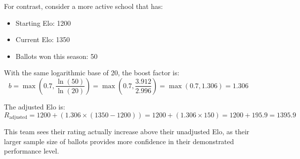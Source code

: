 \documentclass[11pt]{article}
\begin{document}
For contrast, consider a more active school that has:
\begin{itemize}
    \item Starting Elo: 1200
    \item Current Elo: 1350
    \item Ballots won this season: 50
\end{itemize}

With the same logarithmic base of 20, the boost factor is:
\begin{equation}
b = \max\left(0.7, \frac{\ln(50)}{\ln(20)}\right) = \max\left(0.7, \frac{3.912}{2.996}\right) = \max(0.7, 1.306) = 1.306
\end{equation}

The adjusted Elo is:
\begin{equation}
R_{\text{adjusted}} = 1200 + (1.306 \times (1350 - 1200)) = 1200 + (1.306 \times 150) = 1200 + 195.9 = 1395.9
\end{equation}

This team sees their rating actually increase above their unadjusted Elo, as their larger sample size of ballots provides more confidence in their demonstrated performance level.



\end{document}
